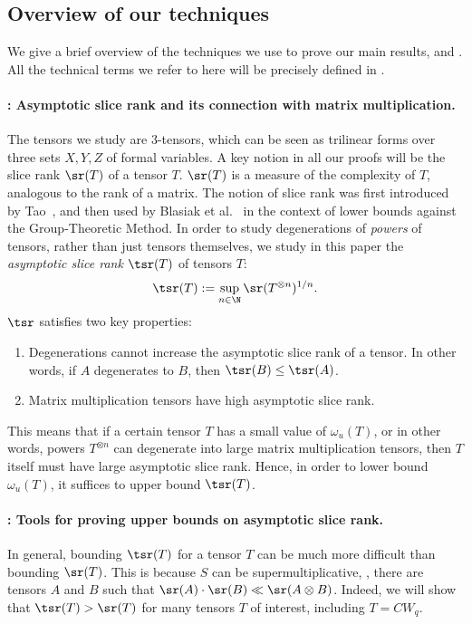 \documentclass{toc}
\begin{document}
%
\subsection{Overview of our techniques} \label{overviewsec}

We give a brief overview of the techniques we use to prove our main results,  and . All the technical terms we refer to here will be precisely defined in .


%
\paragraph{: Asymptotic slice rank and its connection with matrix multiplication.} The tensors we study are 3-tensors, which can be seen as trilinear forms over three sets $X,Y,Z$ of formal variables. A key notion in all our proofs will be the slice rank $\sr(T)$ of a tensor $T$. $\sr(T)$ is a measure of the complexity of $T$, analogous to the rank of a matrix. The notion of slice rank was first introduced by Tao~\cite{tao1}, and then used by Blasiak et al.~\cite{blasiak} in the context of lower bounds against the Group-Theoretic Method. In order to study degenerations of \emph{powers} of tensors, rather than just tensors themselves, we study in this paper the \emph{asymptotic slice rank} $\tsr(T)$ of tensors $T$:
$$\tsr(T) := \sup_{n \in\N} \sr(T^{\otimes n})^{1/n}.$$
$\tsr$ satisfies two key properties:
\begin{enumerate}
    \item Degenerations cannot increase the asymptotic slice rank of a tensor. In other words, if $A$ degenerates to $B$, then $\tsr(B) \leq \tsr(A)$.
    \item Matrix multiplication tensors have high asymptotic slice rank.
\end{enumerate}
This means that if a certain tensor $T$ has a small value of $\omega_u(T)$, or in other words, powers $T^{\otimes n}$ can degenerate into large matrix multiplication tensors, then $T$ itself must have large asymptotic slice rank. Hence, in order to lower bound $\omega_u(T)$, it suffices to upper bound $\tsr(T)$.

%
\paragraph{: Tools for proving upper bounds on asymptotic slice rank.} In general, bounding $\tsr(T)$ for a tensor $T$ can be much more difficult than bounding $\sr(T)$. This is because $S$ can be supermultiplicative, \ie, there are tensors $A$ and $B$ such that $\sr(A) \cdot \sr(B) \ll \sr(A \otimes B)$. Indeed, we will show that $\tsr(T) > \sr(T)$ for many tensors $T$ of interest, including $T = CW_q$.
\end{document}
